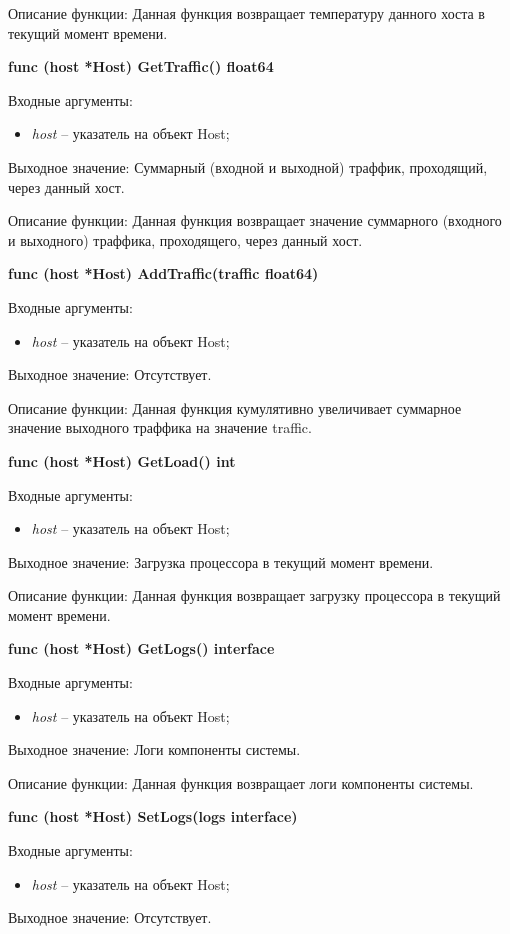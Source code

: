 Описание функции: Данная функция возвращает температуру данного хоста в текущий момент времени.


\textbf{func (host *Host) GetTraffic() float64}

Входные аргументы:
\begin{itemize}
	\item \textit{host} -- указатель на объект Host;
\end{itemize}

Выходное значение: Суммарный (входной и выходной) траффик, проходящий, через данный хост. 

Описание функции: Данная функция возвращает значение суммарного (входного и выходного) траффика, проходящего, через данный хост.


\textbf{func (host *Host) AddTraffic(traffic float64)}

Входные аргументы:
\begin{itemize}
	\item \textit{host} -- указатель на объект Host;
\end{itemize}
Выходное значение: Отсутствует.

Описание функции: Данная функция кумулятивно увеличивает суммарное значение выходного траффика на значение traffic. 


\textbf{func (host *Host) GetLoad() int }

Входные аргументы:
\begin{itemize}
	\item \textit{host} -- указатель на объект Host;
\end{itemize}

Выходное значение: Загрузка процессора в текущий момент времени.

Описание функции: Данная функция возвращает загрузку процессора в текущий момент времени.


\textbf{func (host *Host) GetLogs() interface}

Входные аргументы: 
\begin{itemize}
	\item \textit{host} -- указатель на объект Host;
\end{itemize}
Выходное значение: Логи компоненты системы. 

Описание функции: Данная функция возвращает логи компоненты системы. 


\textbf{func (host *Host) SetLogs(logs interface)}

Входные аргументы:
\begin{itemize}
	\item \textit{host} -- указатель на объект Host;
\end{itemize}
Выходное значение: Отсутствует.


